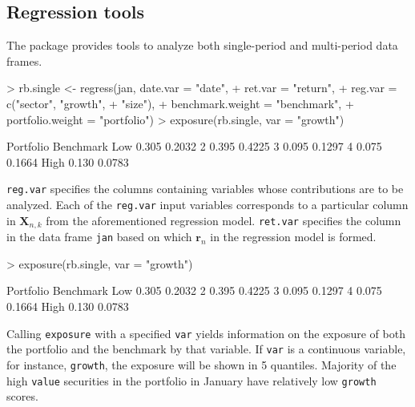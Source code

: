 \subsection{Regression tools}

The  package provides tools to analyze
both single-period and multi-period data frames.

\begin{Schunk}
\begin{Sinput}
> rb.single <- regress(jan, date.var = "date",
+                 ret.var = "return",
+                 reg.var = c("sector", "growth",
+                   "size"),
+                 benchmark.weight = "benchmark",
+                 portfolio.weight = "portfolio")
> exposure(rb.single, var = "growth")
\end{Sinput}
\begin{Soutput}
     Portfolio Benchmark
Low      0.305    0.2032
2        0.395    0.4225
3        0.095    0.1297
4        0.075    0.1664
High     0.130    0.0783
\end{Soutput}
\end{Schunk}

\texttt{reg.var} specifies the columns containing variables whose
contributions are to be analyzed. Each of the \texttt{reg.var} input
variables corresponds to a particular column in $\mathbf{X}_{n,k}$
from the aforementioned regression model. \texttt{ret.var} specifies
the column in the data frame \texttt{jan} based on which
$\mathbf{r}_n$ in the regression model is formed.

\begin{Schunk}
\begin{Sinput}
> exposure(rb.single, var = "growth")
\end{Sinput}
\begin{Soutput}
     Portfolio Benchmark
Low      0.305    0.2032
2        0.395    0.4225
3        0.095    0.1297
4        0.075    0.1664
High     0.130    0.0783
\end{Soutput}
\end{Schunk}

Calling \texttt{exposure} with a specified \texttt{var} yields
information on the exposure of both the portfolio and the benchmark by
that variable. If \texttt{var} is a continuous variable, for instance,
\texttt{growth}, the exposure will be shown in 5 quantiles. Majority
of the high \texttt{value} securities in the portfolio in January have
relatively low \texttt{growth} scores.

